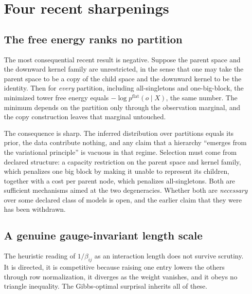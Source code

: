 \documentclass[11pt,letterpaper]{article}
\begin{document}
\section{Four recent sharpenings}

\subsection{The free energy ranks no partition}

The most consequential recent result is negative. Suppose the parent space and the
downward kernel family are unrestricted, in the sense that one may take the parent
space to be a copy of the child space and the downward kernel to be the identity. Then
for \emph{every} partition, including all-singletons and one-big-block, the minimized
tower free energy equals $-\log p^{\mathrm{flat}}(o \mid X)$, the same number. The
minimum depends on the partition only through the observation marginal, and the copy
construction leaves that marginal untouched.

The consequence is sharp. The inferred distribution over partitions equals its prior,
the data contribute nothing, and any claim that a hierarchy ``emerges from the
variational principle'' is vacuous in that regime. Selection must come from declared
structure: a capacity restriction on the parent space and kernel family, which
penalizes one big block by making it unable to represent its children, together with
a cost per parent node, which penalizes all-singletons. Both are sufficient
mechanisms aimed at the two degeneracies. Whether both are \emph{necessary} over some
declared class of models is open, and the earlier claim that they were has been
withdrawn.

\subsection{A genuine gauge-invariant length scale}

The heuristic reading of $1/\beta_{ij}$ as an interaction length does not survive
scrutiny. It is directed, it is competitive because raising one entry lowers the
others through row normalization, it diverges as the weight vanishes, and it obeys no
triangle inequality. The Gibbs-optimal surprisal inherits all of these.
\end{document}
